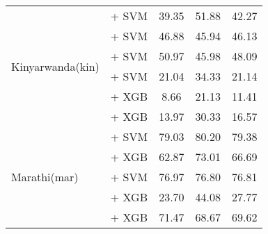 \begin{longtable}{llccc}
    \midrule
    \multirow{6}{*}{Kinyarwanda(kin)}     & \citep{feng2022languageagnosticbertsentenceembedding} + SVM            & 39.35                                & 51.88              & 42.27             \\
                                          & \citep{adelani2023bertmultilingualkinyarwanda} + SVM                   & 46.88                                & 45.94              & 46.13             \\
                                          & \citep{wang2024multilingual} + SVM                                     & 50.97                                & 45.98              & 48.09             \\
                                          & \citep{adelani2023xlmrobertakinyrwanda} + SVM                          & 21.04                                & 34.33              & 21.14             \\
                                          & \citep{all-MiniLM-L12-v2} + XGB                                        & 8.66                                 & 21.13              & 11.41             \\
                                          & \citep{sturua2024jinaembeddingsv3multilingualembeddingstask} + XGB     & 13.97                                & 30.33              & 16.57             \\

    \midrule
    \multirow{5}{*}{Marathi(mar)}         & \citep{wang2024multilingual} + SVM                                     & 79.03                                & 80.20              & 79.38             \\
                                          & \citep{feng2022languageagnosticbertsentenceembedding} + XGB            & 62.87                                & 73.01              & 66.69             \\
                                          & \citep{feng2022languageagnosticbertsentenceembedding} + SVM            & 76.97                                & 76.80              & 76.81             \\
                                          & \citep{all-MiniLM-L12-v2} + XGB                                        & 23.70                                & 44.08              & 27.77             \\
                                          & \citep{sturua2024jinaembeddingsv3multilingualembeddingstask} + XGB     & 71.47                                & 68.67              & 69.62             \\


\end{longtable}
